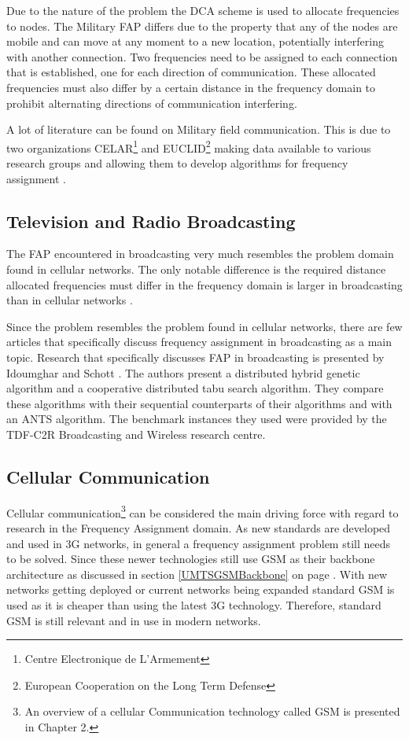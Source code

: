 Due to the nature of the problem the DCA scheme is used to allocate frequencies to nodes. The Military FAP differs due to the property that any of the nodes are mobile and can move at any moment to a new location, potentially interfering with another connection\cite{CALMA,DynamicFAP}. Two frequencies need to be assigned to each connection that is established, one for each direction of communication. These allocated frequencies must also differ by a certain distance in the frequency domain to prohibit alternating directions of communication interfering\cite{CALMA,DynamicFAP}.

A lot of literature can be found on Military field communication. This is due to two organizations CELAR\footnote{Centre Electronique de L'Armement} and EUCLID\footnote{European Cooperation on the Long Term Defense} making data available to various research groups and allowing them to develop algorithms for frequency assignment \cite{CALMA,DynamicFAP}. 

\subsection{Television and Radio Broadcasting}
The FAP encountered in broadcasting very much resembles the problem domain found in cellular networks. The only notable difference is the required distance allocated frequencies must differ in the frequency domain is larger in broadcasting than in cellular networks \cite{Karen2004}.

Since the problem resembles the problem found in cellular networks, there are few articles that specifically discuss frequency assignment in broadcasting as a main topic. Research that specifically discusses FAP in broadcasting is presented by Idoumghar and Schott \cite{RadioFAP}. The authors present a distributed hybrid genetic algorithm and a cooperative distributed tabu search algorithm. They compare these algorithms with their sequential counterparts of their algorithms and with an ANTS algorithm. The benchmark instances they used were provided by the TDF-C2R Broadcasting and Wireless research centre.
\subsection{Cellular Communication}
Cellular communication\footnote{An overview of a cellular Communication technology called GSM is presented in Chapter 2.} can be considered the main driving force with regard to research in the Frequency Assignment domain. As new standards are developed and used in 3G networks, in general a frequency assignment problem still needs to be solved. Since these newer technologies still use GSM as their backbone architecture as discussed in section \ref{UMTSGSMBackbone} on page \pageref{UMTSGSMBackbone}. With new networks getting deployed or current networks being expanded standard GSM is used as it is cheaper than using the latest 3G technology. Therefore, standard GSM is still relevant and in use in modern networks.

